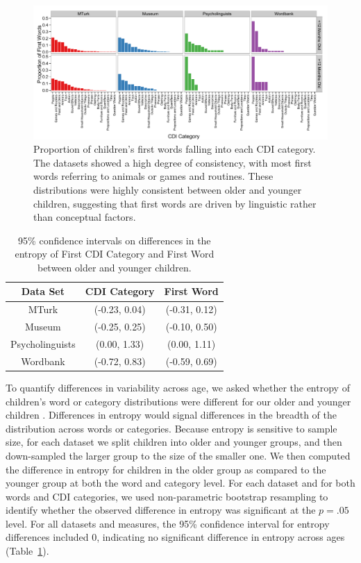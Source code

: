 \documentclass[10pt,letterpaper]{article}
\begin{document}
\begin{figure}[t]
\begin{center}
\includegraphics[width = .9\textwidth]{figures/cdicats_4sets.pdf}
\end{center}
\caption{Proportion of children's first words falling into each CDI category. The datasets showed a high degree of consistency, with most first words referring to animals or games and routines. These distributions were highly consistent between older and younger children, suggesting that first words are driven by linguistic rather than conceptual factors.}
\label{fig:cdi_cats}
\vspace{-1em}
\end{figure}


\begin{table}[tb]
\centering
\begin{tabular}{ccc}
\hline
Data Set & CDI Category & First Word \\ 
  \hline
  MTurk & (-0.23, 0.04) & (-0.31, 0.12) \\ 
  Museum & (-0.25, 0.25) & (-0.10, 0.50) \\ 
  Psycholinguists & (0.00, 1.33) & (0.00, 1.11) \\ 
  Wordbank & (-0.72, 0.83) & (-0.59, 0.69) \\ 
   \hline
\end{tabular}
\caption{\label{tab:ent_diffs} 95\% confidence intervals on differences in the entropy of First CDI Category and First Word between older and younger children.}
\vspace{-1em}
\end{table}

To quantify differences in variability across age, we asked whether the entropy of children's word or category distributions were different for our older and younger children \cite{shannon1948}. Differences in entropy would signal differences in the breadth of the distribution across words or categories. Because entropy is sensitive to sample size, for each dataset we split children into older and younger groups, and then down-sampled the larger group to the size of the smaller one. We then computed the difference in entropy for children in the older group as compared to the younger group at both the word and category level. For each dataset and for both words and CDI categories, we used non-parametric bootstrap resampling to identify whether the observed difference in entropy was significant at the $p = .05$ level. For all datasets and measures, the 95\% confidence interval for entropy differences included 0, indicating no significant difference in entropy across ages (Table~\ref{tab:ent_diffs}).
\end{document}
